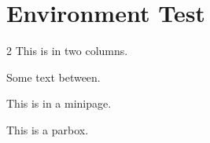\documentclass{article}
\begin{document}
\section{Environment Test}
\begin{multicols}{2}
This is in two columns.
\end{multicols}
Some text between.
\begin{minipage}{0.5\textwidth}
This is in a minipage.
\end{minipage}
\parbox{3in}{This is a parbox.}
\end{document}
